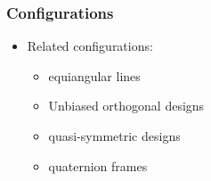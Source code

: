 \documentclass{beamer}
\begin{document}

  

\subsubsection{Configurations}

\begin{frame}

  \begin{itemize}
  \item Related configurations:
    \begin{itemize}
    \item equiangular lines
    \item Unbiased orthogonal designs
    \item quasi-symmetric designs
    \item quaternion frames
    \end{itemize}
  \end{itemize}
  
\end{frame}
\end{document}
